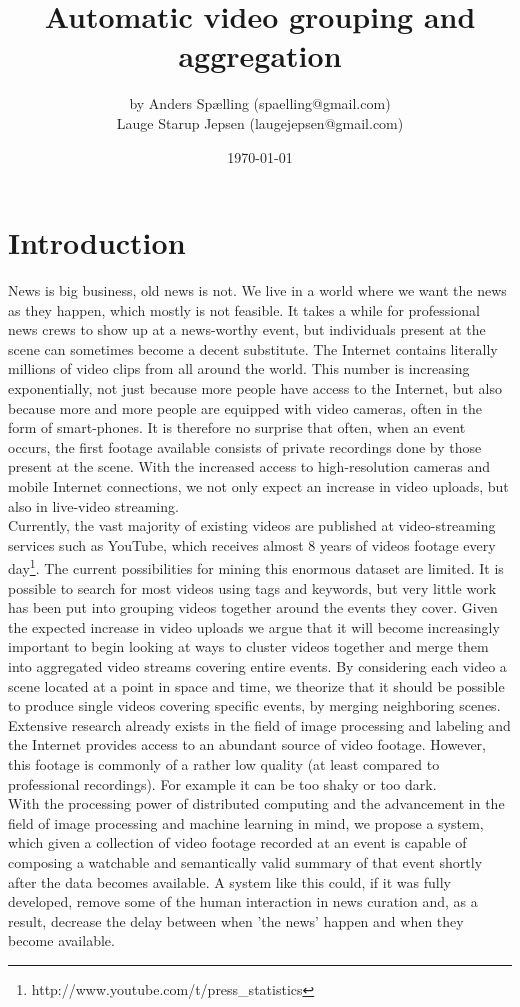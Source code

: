 \documentclass[12pt]{article}
\title{Automatic video grouping and aggregation}
\author{by Anders Spælling (spaelling@gmail.com) \\ Lauge Starup Jepsen (laugejepsen@gmail.com)}
\date{\today}
\begin{document}
\maketitle 
\newpage
\tableofcontents
\newpage
\listoftables
\newpage
%
%
\section{Introduction}
%
News is big business, old news is not. We live in a world where we want the news as they happen, which mostly is not feasible. It takes a while for professional news crews to show up at a news-worthy event, but individuals present at the scene can sometimes become a decent substitute. The Internet contains literally millions of video clips from all around the world. This number is increasing exponentially, not just because more people have access to the Internet, but also because more and more people are equipped with video cameras, often in the form of smart-phones. It is therefore no surprise that often, when an event occurs, the first footage available consists of private recordings done by those present at the scene. With the increased access to high-resolution cameras and mobile Internet connections, we not only expect an increase in video uploads, but also in live-video streaming.\\
Currently, the vast majority of existing videos are published at video-streaming services such as YouTube, which receives almost 8 years of videos footage every day\footnote{http://www.youtube.com/t/press\_statistics}. The current possibilities for mining this enormous dataset are limited. It is possible to search for most videos using tags and keywords, but very little work has been put into grouping videos together around the events they cover. Given the expected increase in video uploads we argue that it will become increasingly important to begin looking at ways to cluster videos together and merge them into aggregated video streams covering entire events. By considering each video a scene located at a point in space and time, we theorize that it should be possible to produce single videos covering specific events, by merging neighboring scenes.\\
Extensive research already exists in the field of image processing and labeling and the Internet provides access to an abundant source of video footage. However, this footage is commonly of a rather low quality (at least compared to professional recordings). For example it can be too shaky or too dark.\\
With the processing power of distributed computing and the advancement in the field of image processing and machine learning in mind, we propose a system, which given a collection of video footage recorded at an event is capable of composing a watchable and semantically valid summary of that event shortly after the data becomes available. A system like this could, if it was fully developed, remove some of the human interaction in news curation and, as a result, decrease the delay between when 'the news' happen and when they become available.
%
\end{document}
